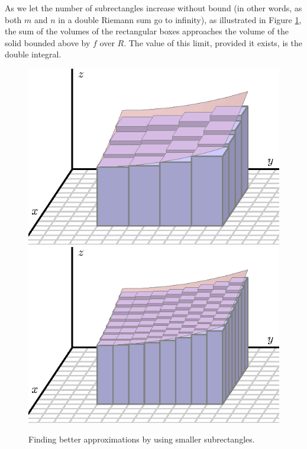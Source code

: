 As we let the number of
subrectangles increase without bound (in other words, as both $m$ and
$n$ in a double Riemann sum go to infinity), as illustrated in
Figure \ref{F:11.1.rs}, the sum of the volumes of the rectangular boxes
approaches the volume of the solid bounded above by $f$ over
$R$. The value of this limit, provided it exists, is the double integral.

\begin{figure}[ht]
  \begin{center}
    \includegraphics{figures/fig_11_1_riemann_4_4.eps}
    \hspace*{20pt}
    \includegraphics{figures/fig_11_1_riemann_8_8.eps}
  \end{center}
  \caption{Finding better approximations by using smaller subrectangles.}
  \label{F:11.1.rs}
\end{figure}

